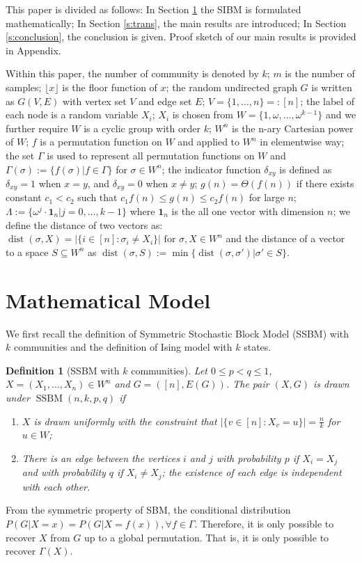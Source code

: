 \label{key}\documentclass[conference]{IEEEtran}
\newtheorem{definition}{Definition}%
\DeclareMathOperator{\SSBM}{SSBM}
\newcommand{\ide}[2]{ \delta_{#1 #2} }
\DeclareMathOperator{\dist}{dist}
\begin{document}
This paper is divided as follows: In Section \ref{s:Preliminaries} the SIBM is formulated mathematically;
In Section \ref{s:trans}, the main results are introduced;
In Section \ref{s:conclusion}, the conclusion is given. Proof sketch of our main results is provided in Appendix.

Within this paper, the number of community is denoted by $k$; $m$ is the number of samples; $\lfloor x \rfloor$ is the floor function of $x$; the random undirected graph $G$ is written as $G(V,E)$ with vertex set $V$ and edge set $E$;
$V=\{1,\dots, n\} =: [n]$;
the label of each node is a random variable $X_i$; $X_i$ is chosen from $W= \{1, \omega, \dots, \omega^{k-1}\}$ and we further require $W$
is a cyclic group with order $k$; $W^n$ is the n-ary Cartesian power of $W$; $f$ is a permutation function on $W$ and applied to $W^n$ in elementwise way; the set $\Gamma$ is used to represent all permutation functions on $W$ and $\Gamma(\sigma):=\{f(\sigma)| f\in \Gamma\}$ for $\sigma \in W^n$; the indicator function $\ide{x}{y}$ is defined as
$\ide{x}{y} = 1 $ when $x=y$, and $\ide{x}{y}=0$ when $x\neq y$; $g(n) = \Theta(f(n))$ if there exists constant $c_1 < c_2$ such that $c_1 f(n) \leq g(n) \leq c_2 f(n)$
for large $n$;
$\Lambda := \{ \omega^j  \cdot \mathbf{1}_n | j=0, \dots,k-1\}$
where $\mathbf{1}_n$ is the all one vector with dimension $n$;
we define the distance of two vectors as:
$\dist(\sigma, X)
=|\{i\in[n]:\sigma_i\neq X_i\}| \textrm{ for } \sigma,X\in W^n
$ and the distance of a vector to a space $S\subseteq W^n$
as
$\dist(\sigma,S)
:=\min\{\dist(\sigma, \sigma') | \sigma' \in S\}
$.

\section{Mathematical Model} \label{s:Preliminaries}
We first recall the definition of Symmetric Stochastic Block Model (SSBM) with $k$ communities \cite{Abbe17} and the definition of Ising model with $k$ states.
\begin{definition}[SSBM with $k$ communities] \label{def:SSBM}
Let $0\leq p<q\leq 1$, $X=(X_1,\dots,X_n)\in W^n$ and $G=([n],E(G))$. The pair $(X,G)$ is drawn under $\SSBM(n,k,p,q)$ if 
\begin{enumerate}
\item $X$ is drawn uniformly with the constraint that $|\{v \in [n] : X_v = u\}| = \frac{n}{k}$ for $u\in W$;

\item There is an edge between the vertices $i$ and $j$ with probability $p$ if $X_i=X_j$ and with probability $q$ if $X_i \neq X_j$; the existence of each edge is independent with each other.
\end{enumerate}
\end{definition}
From the symmetric property of SBM, the conditional distribution $P(G|X=x) = P(G|X=f(x)), \forall f \in \Gamma$. Therefore, it is only possible to recover $X$ from $G$ up to a global permutation. That is, it is only possible to recover $\Gamma(X)$.
\end{document}
